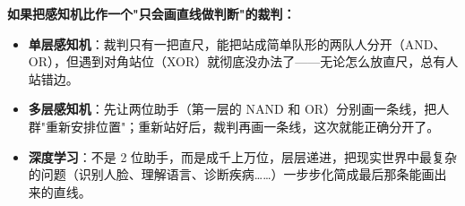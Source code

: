 \documentclass[a4paper,11pt]{ctexart}
\begin{document}
\begin{metaphorbox}[给零基础读者的一句总比喻]
    \textbf{如果把感知机比作一个"只会画直线做判断"的裁判：}
    \begin{itemize}
        \item \textbf{单层感知机}：裁判只有一把直尺，能把站成简单队形的两队人分开（AND、OR），但遇到对角站位（XOR）就彻底没办法了——无论怎么放直尺，总有人站错边。
        \item \textbf{多层感知机}：先让两位助手（第一层的 NAND 和 OR）分别画一条线，把人群"重新安排位置"；重新站好后，裁判再画一条线，这次就能正确分开了。
        \item \textbf{深度学习}：不是 2 位助手，而是成千上万位，层层递进，把现实世界中最复杂的问题（识别人脸、理解语言、诊断疾病……）一步步化简成最后那条能画出来的直线。
    \end{itemize}
\end{metaphorbox}
\end{document}
